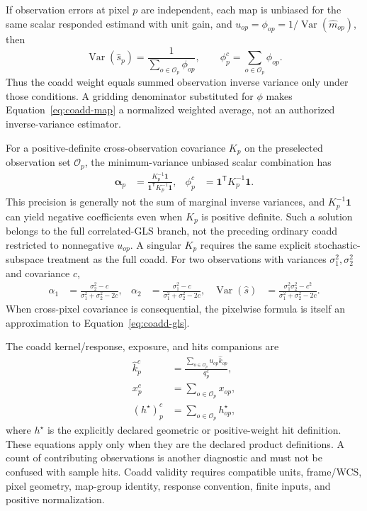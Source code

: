 \documentclass[11pt]{article}
\newcommand{\Var}{\operatorname{Var}}
\newcommand{\trans}{\mathsf{T}}
\begin{document}
If observation errors at pixel \(p\) are independent, each map is unbiased for
the same scalar responded estimand with unit gain, and
\(u_{op}=\phi_{op}=1/\Var(\widehat m_{op})\), then
\begin{equation}
 \Var(\widehat s_p)=\frac{1}{\sum_{o\in\mathcal O_p}\phi_{op}},
 \qquad \phi^c_p=\sum_{o\in\mathcal O_p}\phi_{op}.
 \label{eq:coadd-independent-precision}
\end{equation}
Thus the coadd weight equals summed observation inverse variance only under
those conditions. A gridding denominator substituted for \(\phi\) makes
Equation~\eqref{eq:coadd-map} a normalized weighted average, not an authorized
inverse-variance estimator.

For a positive-definite cross-observation covariance \(K_p\) on the
preselected observation set \(\mathcal O_p\), the minimum-variance unbiased
scalar combination has
\begin{align}
 \boldsymbol\alpha_p&=
 \frac{K_p^{-1}\boldsymbol1}{\boldsymbol1^\trans K_p^{-1}\boldsymbol1},
 &
 \phi^c_p&=\boldsymbol1^\trans K_p^{-1}\boldsymbol1.
 \label{eq:correlated-observation-coadd}
\end{align}
This precision is generally not the sum of marginal inverse variances, and
\(K_p^{-1}\boldsymbol1\) can yield negative coefficients even when \(K_p\) is
positive definite. Such a solution belongs to the full correlated-GLS branch,
not the preceding ordinary coadd restricted to nonnegative \(u_{op}\). A
singular \(K_p\) requires the same explicit stochastic-subspace treatment as
the full coadd. For two
observations with variances \(\sigma_1^2,\sigma_2^2\) and covariance \(c\),
\begin{align}
 \alpha_1&=\frac{\sigma_2^2-c}{\sigma_1^2+\sigma_2^2-2c},&
 \alpha_2&=\frac{\sigma_1^2-c}{\sigma_1^2+\sigma_2^2-2c},&
 \Var(\widehat s)&=
 \frac{\sigma_1^2\sigma_2^2-c^2}{\sigma_1^2+\sigma_2^2-2c}.
 \label{eq:two-observation-coadd}
\end{align}
When cross-pixel covariance is consequential, the pixelwise formula is itself
an approximation to Equation~\eqref{eq:coadd-gls}.

The coadd kernel/response, exposure, and hits companions are
\begin{align}
 \widehat k^c_p&=
 \frac{\sum_{o\in\mathcal O_p}u_{op}\widehat k_{op}}{q^c_p},
 \label{eq:coadd-kernel}\\
 x^c_p&=\sum_{o\in\mathcal O_p}x_{op},
 \label{eq:coadd-coverage}\\
 (h^\star)^c_p&=\sum_{o\in\mathcal O_p}h^\star_{op},
 \label{eq:coadd-hits}
\end{align}
where \(h^\star\) is the explicitly declared geometric or positive-weight hit
definition. These equations apply only when they are the declared product
definitions. A count of contributing
observations is another diagnostic and must not be confused with sample hits.
Coadd validity requires compatible units, frame/WCS, pixel geometry, map-group
identity, response convention, finite inputs, and positive normalization.
\end{document}
